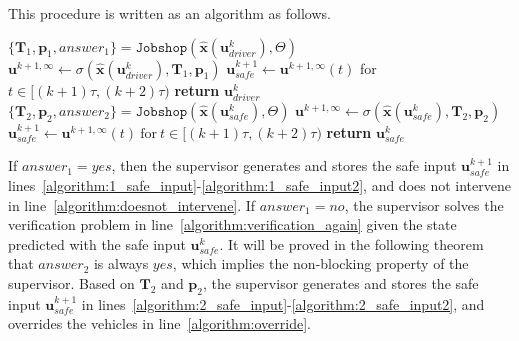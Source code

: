 \documentclass{sig-alternate}
\begin{document}
This procedure is written as an algorithm as follows.
\begin{algorithm}[H]
	\caption{$\mathtt{Supervisor}(\mathbf{x}(k\tau),\mathbf{u}_{driver}^k)$}
	\label{algorithm:supervisor}
	\begin{algorithmic}[1]
		\State $\{\mathbf{T}_1,\mathbf{p}_1,answer_1\}=\mathtt{Jobshop}(\hat{\mathbf{x}}(\mathbf{u}_{driver}^k),\Theta)$\label{algorithm:solve_verification1}
		\State $\mathbf{u}^{k+1,\infty}\gets \sigma(\hat{\mathbf{x}}(\mathbf{u}_{driver}^k),\mathbf{T}_1,\mathbf{p}_1)$\label{algorithm:1_safe_input}
		\State $\mathbf{u}^{k+1}_{safe}\gets \mathbf{u}^{k+1,\infty}(t)$ for $t\in [(k+1)\tau, (k+2)\tau)$\label{algorithm:1_safe_input2}
		\State \textbf{return} $\mathbf{u}_{driver}^k$\label{algorithm:doesnot_intervene}
		\Else
		\State $\{\mathbf{T}_2,\mathbf{p}_2,answer_2\} = \mathtt{Jobshop}(\hat{\mathbf{x}}(\mathbf{u}_{safe}^k),\Theta)$\label{algorithm:verification_again}
		\State $\mathbf{u}^{k+1,\infty}\gets \sigma(\hat{\mathbf{x}}(\mathbf{u}_{safe}^k),\mathbf{T}_2,\mathbf{p}_2)$\label{algorithm:2_safe_input}
		\State $\mathbf{u}_{safe}^{k+1}\gets \mathbf{u}^{k+1,\infty}(t)~ \text{for}~ t\in[(k+1)\tau, (k+2)\tau)$\label{algorithm:2_safe_input2}
		\State \textbf{return} $\mathbf{u}_{safe}^k$\label{algorithm:override}
		\EndIf
	\end{algorithmic}
\end{algorithm}
If $answer_1=yes$, then the supervisor generates and stores the safe input $\mathbf{u}_{safe}^{k+1}$ in lines~\ref{algorithm:1_safe_input}-\ref{algorithm:1_safe_input2}, and does not intervene in line~\ref{algorithm:doesnot_intervene}. If $answer_1=no$, the supervisor solves the verification problem in line~\ref{algorithm:verification_again} given the state predicted with the safe input $\mathbf{u}_{safe}^k$. It will be proved in the following theorem that $answer_2$ is always $yes$, which implies the non-blocking property of the supervisor. Based on $\mathbf{T}_2$ and $\mathbf{p}_2$, the supervisor generates and stores the safe input $\mathbf{u}_{safe}^{k+1}$ in lines~\ref{algorithm:2_safe_input}-\ref{algorithm:2_safe_input2}, and overrides the vehicles in line~\ref{algorithm:override}.
\end{document}
